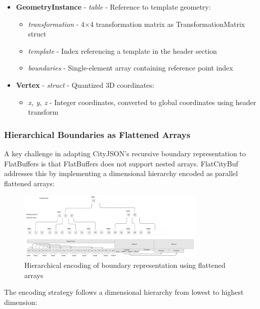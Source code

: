 \begin{itemize}
  \item \textbf{GeometryInstance} - \textit{table} - Reference to template geometry:
    \begin{itemize}
      \item \textit{transformation} - 4×4 transformation matrix as TransformationMatrix struct
      \item \textit{template} - Index referencing a template in the header section
      \item \textit{boundaries} - Single-element array containing reference point index
    \end{itemize}

  \item \textbf{Vertex} - \textit{struct} - Quantized 3D coordinates:
    \begin{itemize}
      \item \textit{x, y, z} - Integer coordinates, converted to global coordinates using header transform
    \end{itemize}
\end{itemize}

\subsubsection{Hierarchical Boundaries as Flattened Arrays}
\label{methodology:feature_encoding:geometry_encoding:flattened_arrays}

A key challenge in adapting CityJSON's recursive boundary representation to FlatBuffers is that FlatBuffers does not support nested arrays. FlatCityBuf addresses this by implementing a dimensional hierarchy encoded as parallel flattened arrays:

\begin{figure}[h]
  \centering
  \includegraphics[width=0.8\textwidth]{figs/methodology/attribute_index.png}
  \caption{Hierarchical encoding of boundary representation using flattened arrays}
  \label{fig:methodology:boundary_encoding}
\end{figure}

The encoding strategy follows a dimensional hierarchy from lowest to highest dimension:

